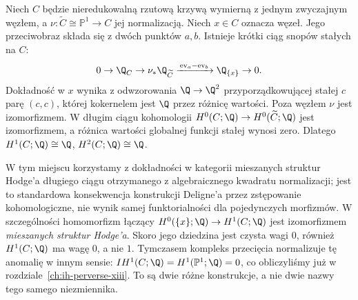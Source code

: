 \begin{przyklad}
\label{ex:nodal-mhs-xiv}
Niech $C$ będzie nieredukowalną rzutową krzywą
wymierną z jednym zwyczajnym węzłem, a
$\nu:\widetilde C\cong\mathbb P^1\to C$ jej normalizacją.
Niech $x\in C$ oznacza węzeł.
Jego przeciwobraz składa się z dwóch punktów $a,b$.
Istnieje krótki ciąg snopów stałych na $C$:
\[
0\to\Q_C\to\nu_*\Q_{\widetilde C}
\xrightarrow{\,\mathrm{ev}_a-\mathrm{ev}_b\,}
\Q_{\{x\}}\to0.
\]
Dokładność w $x$ wynika z odwzorowania $\Q\to\Q^2$
przyporządkowującej stałej $c$ parę $(c,c)$,
której kokernelem jest $\Q$ przez różnicę wartości.
Poza węzłem $\nu$ jest izomorfizmem.
W długim ciągu kohomologii $H^0(C;\Q)\to
H^0(\widetilde C;\Q)$ jest izomorfizmem,
a różnica wartości globalnej funkcji stałej
wynosi zero. Dlatego
$H^1(C;\Q)\cong\Q$,
$H^2(C;\Q)\cong\Q$.

W tym miejscu korzystamy z dokładności
w kategorii mieszanych struktur Hodge'a długiego ciągu
otrzymanego z algebraicznego kwadratu normalizacji;
jest to standardowa konsekwencja konstrukcji Deligne'a
przez zstępowanie kohomologiczne, nie wynik samej
funktorialności dla pojedynczych morfizmów.
W szczególności homomorfizm łączący
$H^0(\{x\};\Q)\to H^1(C;\Q)$ jest izomorfizmem
\emph{mieszanych struktur Hodge'a}.
Skoro jego dziedzina jest czysta wagi $0$,
również $H^1(C;\Q)$ ma wagę $0$, a nie $1$.
Tymczasem kompleks przecięcia normalizuje tę
anomalię w innym sensie:
$IH^1(C;\Q)=H^1(\mathbb P^1;\Q)=0$,
co obliczyliśmy już w rozdziale~\ref{ch:ih-perverse-xiii}.
To są dwie różne konstrukcje, a nie dwie nazwy
tego samego niezmiennika.
\end{przyklad}

